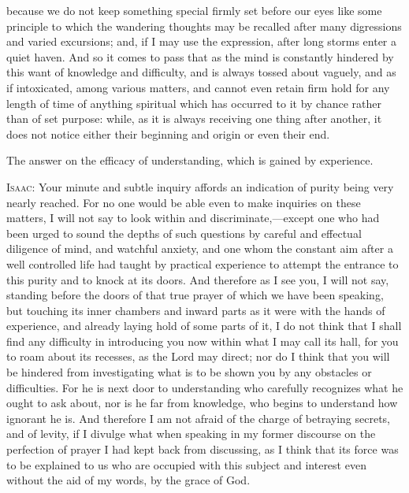because we do not keep something special firmly set before our eyes like some principle to which the wandering thoughts may be recalled after many digressions and varied excursions; and, if I may use the expression, after long storms enter a quiet haven. And so it comes to pass that as the mind is constantly hindered by this want of knowledge and difficulty, and is always tossed about vaguely, and as if intoxicated, among various matters, and cannot even retain firm hold for any length of time of anything spiritual which has occurred to it by chance rather than of set purpose: while, as it is always receiving one thing after another, it does not notice either their beginning and origin or even their end.


The answer on the efficacy of understanding, which is gained by experience.

\textsc{Isaac}: Your minute and subtle inquiry affords an indication of purity being very nearly reached. For no one would be able even to make inquiries on these matters, I will not say to look within and discriminate,—except one who had been urged to sound the depths of such questions by careful and effectual diligence of mind, and watchful anxiety, and one whom the constant aim after a well controlled life had taught by practical experience to attempt the entrance to this purity and to knock at its doors. And therefore as I see you, I will not say, standing before the doors of that true prayer of which we have been speaking, but touching its inner chambers and inward parts as it were with the hands of experience, and already laying hold of some parts of it, I do not think that I shall find any difficulty in introducing you now within what I may call its hall, for you to roam about its recesses, as the Lord may direct; nor do I think that you will be hindered from investigating what is to be shown you by any obstacles or difficulties. For he is next door to understanding who carefully recognizes what he ought to ask about, nor is he far from knowledge, who begins to understand how ignorant he is. And therefore I am not afraid of the charge of betraying secrets, and of levity, if I divulge what when speaking in my former discourse on the perfection of prayer I had kept back from discussing, as I think that its force was to be explained to us who are occupied with this subject and interest even without the aid of my words, by the grace of God.

